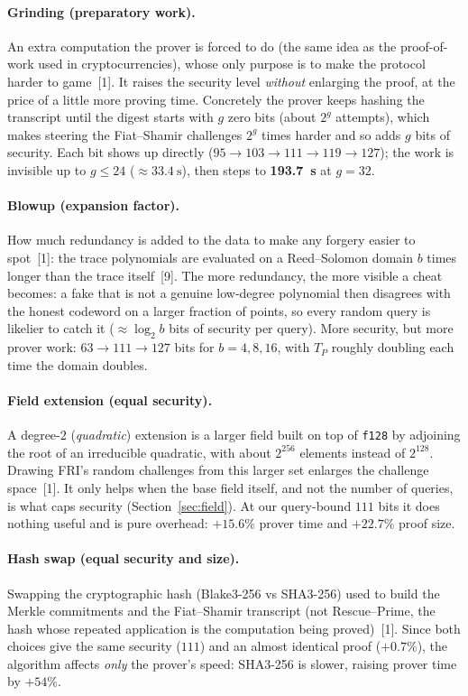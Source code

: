 \documentclass[11pt]{article}
\begin{document}
\paragraph{Grinding (preparatory work).} An extra computation the prover is forced to do (the same
idea as the proof-of-work used in cryptocurrencies), whose only purpose is to make the protocol harder
to game~[1]. It raises the security level \emph{without} enlarging the proof, at
the price of a little more proving time. Concretely the prover keeps hashing the transcript until the
digest starts with $g$ zero bits (about $2^{g}$ attempts), which makes steering the Fiat--Shamir
challenges $2^{g}$ times harder and so adds $g$ bits of security. Each bit shows up directly
($95\!\to\!103\!\to\!111\!\to\!119\!\to\!127$); the work is invisible up to $g\le24$
($\approx\!\SI{33.4}{\second}$), then steps to \textbf{\SI{193.7}{\second}} at $g=32$.

\paragraph{Blowup (expansion factor).} How much redundancy is added to the data to make any forgery
easier to spot~[1]: the trace polynomials are evaluated on a Reed--Solomon domain
$b$ times longer than the trace itself~[9]. The more redundancy, the more visible a
cheat becomes: a fake that is not a genuine low-degree polynomial then disagrees with the honest
codeword on a larger fraction of points, so every random query is likelier to catch it ($\approx\log_2 b$
bits of security per query). More security, but more prover work: $63\!\to\!111\!\to\!127$ bits for
$b=4,8,16$, with $T_P$ roughly doubling each time the domain doubles.

\paragraph{Field extension (equal security).} A degree-$2$ (\emph{quadratic}) extension is a larger field
built on top of \texttt{f128} by adjoining the root of an irreducible quadratic, with about $2^{256}$
elements instead of $2^{128}$. Drawing FRI's random challenges from this larger set enlarges the
challenge space~[1]. It only helps when the base field itself, and not the number
of queries, is what caps security (Section~\ref{sec:field}). At our query-bound $111$ bits it does
nothing useful and is pure overhead: $+15.6\%$ prover time and $+22.7\%$ proof size.

\paragraph{Hash swap (equal security and size).} Swapping the cryptographic hash (Blake3-256 vs
SHA3-256) used to build the Merkle commitments and the Fiat--Shamir transcript (not Rescue--Prime,
the hash whose repeated application is the computation being proved)~[1]. Since both choices give the same security ($111$) and an almost
identical proof ($+0.7\%$), the algorithm affects \emph{only} the prover's speed: SHA3-256 is slower,
raising prover time by \textbf{$+54\%$}.
\end{document}

